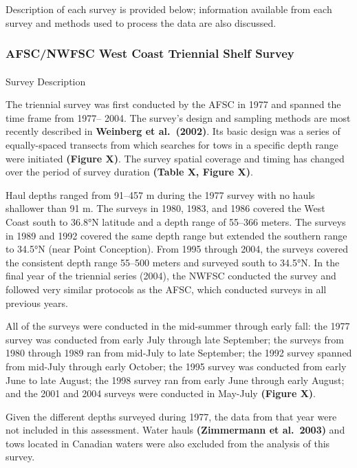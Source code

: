 \documentclass[
]{scrartcl}
\makeatletter
\let\oldparagraph\paragraph
\renewcommand{\paragraph}{
    \@ifstar
      \xxxParagraphStar
      \xxxParagraphNoStar
  }
\newcommand{\xxxParagraphStar}[1]{\oldparagraph*{#1}\mbox{}}
\newcommand{\xxxParagraphNoStar}[1]{\oldparagraph{#1}\mbox{}}
\makeatother
\begin{document}
Description of each survey is provided below; information available from
each survey and methods used to process the data are also discussed.

\subsubsection{AFSC/NWFSC West Coast Triennial Shelf
Survey}\label{afscnwfsc-west-coast-triennial-shelf-survey}

\paragraph{Survey Description}\label{survey-description}

The triennial survey was first conducted by the AFSC in 1977 and spanned
the time frame from 1977-- 2004. The survey's design and sampling
methods are most recently described in \textbf{Weinberg et al.~(2002)}.
Its basic design was a series of equally-spaced transects from which
searches for tows in a specific depth range were initiated
\textbf{(Figure X)}. The survey spatial coverage and timing has changed
over the period of survey duration \textbf{(Table X, Figure X)}.

Haul depths ranged from 91--457 m during the 1977 survey with no hauls
shallower than 91 m. The surveys in 1980, 1983, and 1986 covered the
West Coast south to 36.8°N latitude and a depth range of 55--366 meters.
The surveys in 1989 and 1992 covered the same depth range but extended
the southern range to 34.5°N (near Point Conception). From 1995 through
2004, the surveys covered the consistent depth range 55--500 meters and
surveyed south to 34.5°N. In the final year of the triennial series
(2004), the NWFSC conducted the survey and followed very similar
protocols as the AFSC, which conducted surveys in all previous years.

All of the surveys were conducted in the mid-summer through early fall:
the 1977 survey was conducted from early July through late September;
the surveys from 1980 through 1989 ran from mid-July to late September;
the 1992 survey spanned from mid-July through early October; the 1995
survey was conducted from early June to late August; the 1998 survey ran
from early June through early August; and the 2001 and 2004 surveys were
conducted in May-July \textbf{(Figure X)}.

Given the different depths surveyed during 1977, the data from that year
were not included in this assessment. Water hauls \textbf{(Zimmermann et
al.~2003)} and tows located in Canadian waters were also excluded from
the analysis of this survey.
\end{document}
